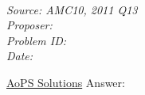 \SSbreak\\
\emph{Source: AMC10, 2011 Q13}\\
\emph{Proposer: \Pss}\\
\emph{Problem ID: }\\
\emph{Date: }\\
\SSbreak

\bigskip

\begin{solution}\hfil\medskip

\href{https://artofproblemsolving.com/wiki/index.php/2011_AMC_10A_Problems/Problem_13}{AoPS Solutions} Answer: 
\end{solution}\bigskip
